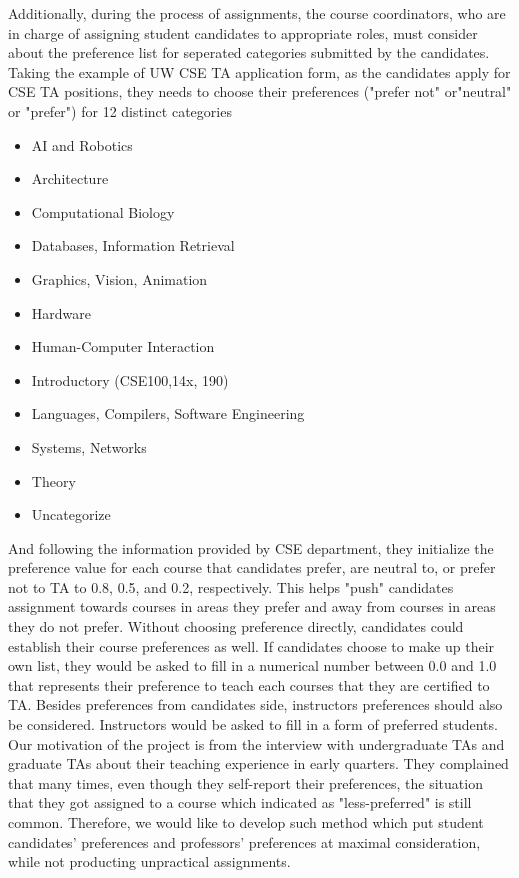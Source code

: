 \documentclass[twoside,twocolumn]{article}
\begin{document}
    Additionally, during the process of assignments, the course coordinators, who are in charge of assigning student candidates
    to appropriate roles, must consider about the preference list for seperated categories submitted by the candidates. Taking
    the example of UW CSE TA application form, as the candidates apply for CSE TA positions, they needs to choose their preferences 
    ("prefer not" or"neutral" or "prefer") for 12 distinct categories
    \begin{itemize}
        \item AI and Robotics			
        \item Architecture			
        \item Computational Biology			
        \item Databases, Information Retrieval			
        \item Graphics, Vision, Animation			
        \item Hardware			
        \item Human-Computer Interaction			
        \item Introductory (CSE100,14x, 190)			
        \item Languages, Compilers, Software Engineering			
        \item Systems, Networks
        \item Theory			
        \item Uncategorize
    \end{itemize}
    And following the information provided by CSE department, they initialize the preference value for each course that candidates prefer, 
    are neutral to, or prefer not to TA to 0.8, 0.5, and 0.2, respectively. This helps "push" candidates assignment towards courses 
    in areas they prefer and away from courses in areas they do not prefer. Without choosing preference directly, candidates could establish
    their course preferences as well. If candidates choose to make up their own list, they would be asked to fill in a numerical number 
    between 0.0 and 1.0 that represents their preference to teach each courses that they are certified to TA. Besides preferences from 
    candidates side, instructors preferences should also be considered. Instructors would be asked to fill in a form of preferred students.
    Our motivation of the project is from the interview with undergraduate TAs and graduate TAs about their teaching experience in early quarters.
    They complained that many times, even though they self-report their preferences, the situation that they got assigned to a course which 
    indicated as "less-preferred" is still common. Therefore, we would like to develop such method which put student candidates' preferences and
    professors' preferences at maximal consideration, while not producting unpractical assignments.
\end{document}
